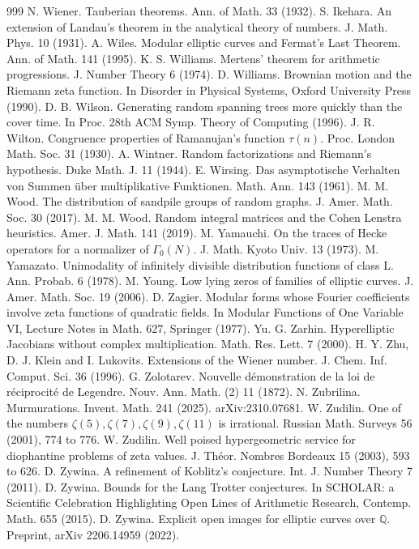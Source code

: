 \begin{thebibliography}{999}
 N. Wiener. Tauberian theorems. Ann. of Math. 33 (1932).
 S. Ikehara. An extension of Landau's theorem in the analytical theory of numbers. J. Math. Phys. 10 (1931).
 A. Wiles. Modular elliptic curves and Fermat's Last Theorem. Ann. of Math. 141 (1995).
 K. S. Williams. Mertens' theorem for arithmetic progressions. J. Number Theory 6 (1974).
 D. Williams. Brownian motion and the Riemann zeta function. In Disorder in Physical Systems, Oxford University Press (1990).
 D. B. Wilson. Generating random spanning trees more quickly than the cover time. In Proc. 28th ACM Symp. Theory of Computing (1996).
 J. R. Wilton. Congruence properties of Ramanujan's function $\tau(n)$. Proc. London Math. Soc. 31 (1930).
 A. Wintner. Random factorizations and Riemann's hypothesis. Duke Math. J. 11 (1944).
 E. Wirsing. Das asymptotische Verhalten von Summen \"uber multiplikative Funktionen. Math. Ann. 143 (1961).
 M. M. Wood. The distribution of sandpile groups of random graphs. J. Amer. Math. Soc. 30 (2017).
 M. M. Wood. Random integral matrices and the Cohen Lenstra heuristics. Amer. J. Math. 141 (2019).
 M. Yamauchi. On the traces of Hecke operators for a normalizer of $\Gamma_0(N)$. J. Math. Kyoto Univ. 13 (1973).
 M. Yamazato. Unimodality of infinitely divisible distribution functions of class L. Ann. Probab. 6 (1978).
 M. Young. Low lying zeros of families of elliptic curves. J. Amer. Math. Soc. 19 (2006).
 D. Zagier. Modular forms whose Fourier coefficients involve zeta functions of quadratic fields. In Modular Functions of One Variable VI, Lecture Notes in Math. 627, Springer (1977).
 Yu. G. Zarhin. Hyperelliptic Jacobians without complex multiplication. Math. Res. Lett. 7 (2000).
 H. Y. Zhu, D. J. Klein and I. Lukovits. Extensions of the Wiener number. J. Chem. Inf. Comput. Sci. 36 (1996).
 G. Zolotarev. Nouvelle d\'emonstration de la loi de r\'eciprocit\'e de Legendre. Nouv. Ann. Math. (2) 11 (1872).
 N. Zubrilina. Murmurations. Invent. Math. 241 (2025). arXiv:2310.07681.
 W. Zudilin. One of the numbers $\zeta(5),\zeta(7),\zeta(9),\zeta(11)$ is irrational. Russian Math. Surveys 56 (2001), 774 to 776.
 W. Zudilin. Well poised hypergeometric service for diophantine problems of zeta values. J. Th\'eor. Nombres Bordeaux 15 (2003), 593 to 626.
 D. Zywina. A refinement of Koblitz's conjecture. Int. J. Number Theory 7 (2011).
 D. Zywina. Bounds for the Lang Trotter conjectures. In SCHOLAR: a Scientific Celebration Highlighting Open Lines of Arithmetic Research, Contemp. Math. 655 (2015).
 D. Zywina. Explicit open images for elliptic curves over $\mathbb{Q}$. Preprint, arXiv 2206.14959 (2022).
\end{thebibliography}
